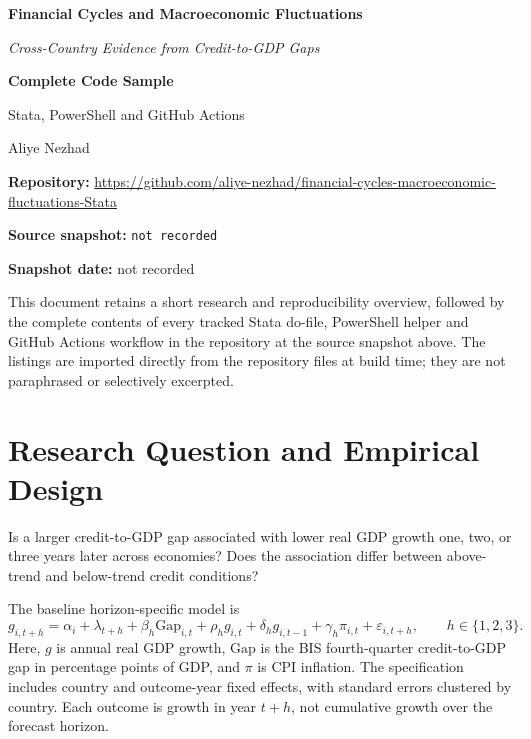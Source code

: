 \documentclass[10pt]{article}
\newcommand{\SourceCommit}{\texttt{not recorded}}
\newcommand{\SourceDate}{not recorded}
\begin{document}
\begin{titlepage}
\thispagestyle{empty}
\vspace*{1.15in}
{\Large\bfseries Financial Cycles and Macroeconomic Fluctuations\par}
\vspace{0.12in}
{\large\itshape Cross-Country Evidence from Credit-to-GDP Gaps\par}
\vspace{0.28in}
{\LARGE\bfseries Complete Code Sample\par}
\vspace{0.12in}
{\large Stata, PowerShell and GitHub Actions\par}
\vspace{0.55in}
Aliye Nezhad\par
\vspace{0.12in}
\textbf{Repository:} \url{https://github.com/aliye-nezhad/financial-cycles-macroeconomic-fluctuations-Stata}\par
\vspace{0.15in}
\textbf{Source snapshot:} \SourceCommit\par
\textbf{Snapshot date:} \SourceDate\par
\vfill
\begin{minipage}{0.92\textwidth}
\small
This document retains a short research and reproducibility overview, followed by the complete contents of every tracked Stata do-file, PowerShell helper and GitHub Actions workflow in the repository at the source snapshot above. The listings are imported directly from the repository files at build time; they are not paraphrased or selectively excerpted.
\end{minipage}
\end{titlepage}

\tableofcontents
\clearpage

\section{Research Question and Empirical Design}
Is a larger credit-to-GDP gap associated with lower real GDP growth one, two, or three years later across economies? Does the association differ between above-trend and below-trend credit conditions?

The baseline horizon-specific model is
\[
g_{i,t+h}=\alpha_i+\lambda_{t+h}+\beta_h\mathrm{Gap}_{i,t}
+\rho_hg_{i,t}+\delta_hg_{i,t-1}+\gamma_h\pi_{i,t}
+\varepsilon_{i,t+h},\qquad h\in\{1,2,3\}.
\]
Here, \(g\) is annual real GDP growth, \(\mathrm{Gap}\) is the BIS fourth-quarter credit-to-GDP gap in percentage points of GDP, and \(\pi\) is CPI inflation. The specification includes country and outcome-year fixed effects, with standard errors clustered by country. Each outcome is growth in year \(t+h\), not cumulative growth over the forecast horizon.
\end{document}
